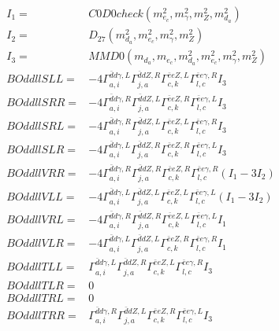 \documentclass[A4,landscape]{article}
\begin{document}
\begin{align} 
I_1 = & C0D0check(m^2_{e_{{c}}}, m^2_{\gamma}, m^2_{Z}, m^2_{d_{{a}}}) \\ 
I_2 = & D_{27}(m^2_{d_{{a}}}, m^2_{e_{{c}}}, m^2_{\gamma}, m^2_{Z}) \\ 
I_3 = & MMD0(m_{d_{{a}}}, m_{e_{{c}}}, m^2_{d_{{a}}}, m^2_{e_{{c}}}, m^2_{\gamma}, m^2_{Z}) \\ 
  BOddllSLL= & -4  \Gamma^{\bar{d}d \gamma ,L}_{a, i} \Gamma^{\bar{d}d Z ,R}_{j, a} \Gamma^{\bar{e}e Z ,L}_{c, k} \Gamma^{\bar{e}e \gamma ,R}_{l, c} I_3 \\ 
  BOddllSRR= & -4  \Gamma^{\bar{d}d \gamma ,R}_{a, i} \Gamma^{\bar{d}d Z ,L}_{j, a} \Gamma^{\bar{e}e Z ,R}_{c, k} \Gamma^{\bar{e}e \gamma ,L}_{l, c} I_3 \\ 
  BOddllSRL= & -4  \Gamma^{\bar{d}d \gamma ,R}_{a, i} \Gamma^{\bar{d}d Z ,L}_{j, a} \Gamma^{\bar{e}e Z ,L}_{c, k} \Gamma^{\bar{e}e \gamma ,R}_{l, c} I_3 \\ 
  BOddllSLR= & -4  \Gamma^{\bar{d}d \gamma ,L}_{a, i} \Gamma^{\bar{d}d Z ,R}_{j, a} \Gamma^{\bar{e}e Z ,R}_{c, k} \Gamma^{\bar{e}e \gamma ,L}_{l, c} I_3 \\ 
  BOddllVRR= & -4  \Gamma^{\bar{d}d \gamma ,R}_{a, i} \Gamma^{\bar{d}d Z ,R}_{j, a} \Gamma^{\bar{e}e Z ,R}_{c, k} \Gamma^{\bar{e}e \gamma ,R}_{l, c} (I_1 - 3 I_2) \\ 
  BOddllVLL= & -4  \Gamma^{\bar{d}d \gamma ,L}_{a, i} \Gamma^{\bar{d}d Z ,L}_{j, a} \Gamma^{\bar{e}e Z ,L}_{c, k} \Gamma^{\bar{e}e \gamma ,L}_{l, c} (I_1 - 3 I_2) \\ 
  BOddllVRL= & -4  \Gamma^{\bar{d}d \gamma ,R}_{a, i} \Gamma^{\bar{d}d Z ,R}_{j, a} \Gamma^{\bar{e}e Z ,L}_{c, k} \Gamma^{\bar{e}e \gamma ,L}_{l, c} I_1 \\ 
  BOddllVLR= & -4  \Gamma^{\bar{d}d \gamma ,L}_{a, i} \Gamma^{\bar{d}d Z ,L}_{j, a} \Gamma^{\bar{e}e Z ,R}_{c, k} \Gamma^{\bar{e}e \gamma ,R}_{l, c} I_1 \\ 
  BOddllTLL= &  \Gamma^{\bar{d}d \gamma ,L}_{a, i} \Gamma^{\bar{d}d Z ,R}_{j, a} \Gamma^{\bar{e}e Z ,L}_{c, k} \Gamma^{\bar{e}e \gamma ,R}_{l, c} I_3 \\ 
  BOddllTLR= & 0 \\ 
  BOddllTRL= & 0 \\ 
  BOddllTRR= &  \Gamma^{\bar{d}d \gamma ,R}_{a, i} \Gamma^{\bar{d}d Z ,L}_{j, a} \Gamma^{\bar{e}e Z ,R}_{c, k} \Gamma^{\bar{e}e \gamma ,L}_{l, c} I_3 \\ 
\end{align} 
\end{document}
